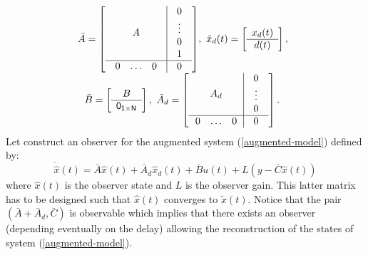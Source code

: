 \documentclass[a4paper, 10pt, onecolumn]{article}
\begin{document}
\begin{equation*}
\begin{array}{c}
\!\!\!\bar{A}=\left[\begin{array}{c|c}A&\begin{array}{c}0\\ \vdots \\ 0 \\1\end{array}\\ \hline \begin{array}{ccc}0& \ldots &0\end{array}&0 \end{array}\right]\!,~\tilde{x}_d(t)=\left[\begin{array}{c}x_d(t)\\ \hline d(t) \end{array}\right],\\
\!\!\!\!\bar{B}=\left[\begin{array}{c}B\\ \hline \sf{0}_{1\times N} \end{array}\right],~\bar{A}_d=\left[\begin{array}{c|c}\!\!A_d\!\!&\begin{array}{c}0\\ \vdots \\ 0 \end{array}\\ \hline \!\!\begin{array}{ccc}0& \ldots & 0 \end{array}\!\!&0 \end{array}\right]
.\\
\end{array}
\end{equation*}
Let construct an observer for the augmented system (\ref{augmented-model}) defined by:
\begin{equation}
\label{observer}
\dot{\hat{x}}(t)=\bar{A}\hat{x}(t)+\bar{A}_d\hat{x}_d(t)+\bar{B}u(t)+L\left(y-\bar{C}\hat{x}(t)\right)
\end{equation}
where $\hat{x}(t)$ is the observer state and $L$ is the observer gain. This latter matrix has to be designed such that $\hat{x}(t)$ converges to $\tilde{x}(t)$. Notice that the pair $(\bar A+\bar A_d,\bar C)$ is observable which implies that there exists an observer (depending eventually on the delay) allowing the reconstruction of the states of system (\ref{augmented-model}).
\end{document}
